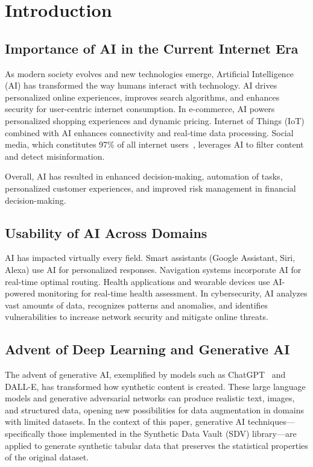 \documentclass[conference]{IEEEtran}
\begin{document}
\section{Introduction}

\subsection{Importance of AI in the Current Internet Era}
As modern society evolves and new technologies emerge, Artificial Intelligence (AI) has transformed the way humans interact with technology. AI drives personalized online experiences, improves search algorithms, and enhances security for user-centric internet consumption. In e-commerce, AI powers personalized shopping experiences and dynamic pricing. Internet of Things (IoT) combined with AI enhances connectivity and real-time data processing. Social media, which constitutes 97\% of all internet users~\cite{searchenginejournal}, leverages AI to filter content and detect misinformation.

Overall, AI has resulted in enhanced decision-making, automation of tasks, personalized customer experiences, and improved risk management in financial decision-making.

\subsection{Usability of AI Across Domains}
AI has impacted virtually every field. Smart assistants (Google Assistant, Siri, Alexa) use AI for personalized responses. Navigation systems incorporate AI for real-time optimal routing. Health applications and wearable devices use AI-powered monitoring for real-time health assessment. In cybersecurity, AI analyzes vast amounts of data, recognizes patterns and anomalies, and identifies vulnerabilities to increase network security and mitigate online threats.

\subsection{Advent of Deep Learning and Generative AI}
The advent of generative AI, exemplified by models such as ChatGPT~\cite{openai2022} and DALL-E, has transformed how synthetic content is created. These large language models and generative adversarial networks can produce realistic text, images, and structured data, opening new possibilities for data augmentation in domains with limited datasets. In the context of this paper, generative AI techniques---specifically those implemented in the Synthetic Data Vault (SDV) library---are applied to generate synthetic tabular data that preserves the statistical properties of the original dataset.
\end{document}
